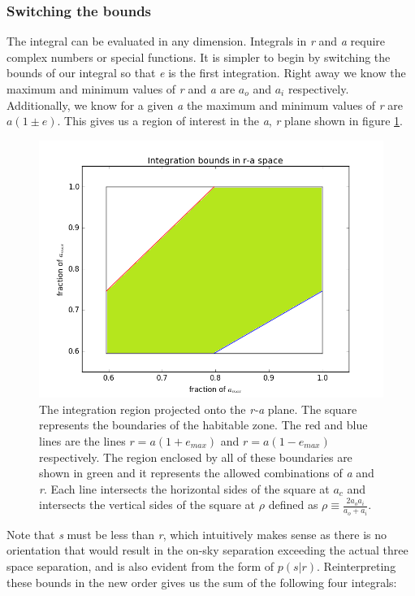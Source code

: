 \documentclass{article}
\begin{document}
	\subsubsection{Switching the bounds}
	The integral can be evaluated in any dimension. Integrals in \textit{r} and \textit{a} require complex numbers or special functions. It is simpler to begin by switching the bounds of our integral so that \textit{e} is the first integration.
	Right away we know the maximum and minimum values of \textit{r} and \textit{a} are $a_{o}$ and $a_{i}$ respectively. Additionally, we know for a given \textit{a} the maximum and minimum values of \textit{r} are $a(1 \pm e)$. This gives us a region of interest in the \textit{a}, \textit{r} plane shown in figure \ref{a vs r}. 
	
	\begin{figure}
		\includegraphics[width = \linewidth]{bounds_a_r.png}
		\caption{The integration region projected onto the \textit{r-a} plane. The square represents the boundaries of the habitable zone. The red and blue lines are the lines $r = a(1 + e_{max})$ and $r = a(1 -  e_{max})$ respectively. The region enclosed by all of these boundaries are shown in green and it represents the allowed combinations of \textit{a} and \textit{r}. Each line intersects the horizontal sides of the square at $a_{c}$ and intersects the vertical sides of the square at $\rho$ defined as $\rho \equiv \frac{2 a_{o} a_{i}}{a_{o} + a_{i}}$.}
		\label{a vs r}
	\end{figure}

	Note that \textit{s} must be less than \textit{r}, which intuitively makes sense as there is no orientation that would result in the on-sky separation exceeding the actual three space separation, and is also evident from the form of $p(s|r)$. Reinterpreting these bounds in the new order gives us the sum of the following four integrals:
	
\end{document}
